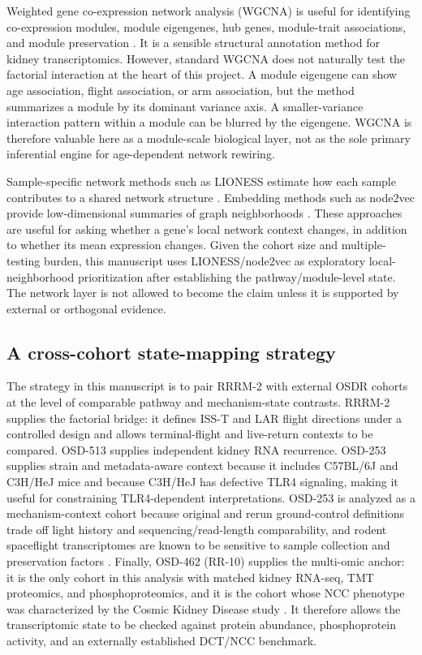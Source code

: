 \documentclass[11pt]{article}
\begin{document}
Weighted gene co-expression network analysis (WGCNA) is useful for identifying co-expression modules, module eigengenes, hub genes, module-trait associations, and module preservation \citep{langfelder2008wgcna,langfelder2011preservation}. It is a sensible structural annotation method for kidney transcriptomics. However, standard WGCNA does not naturally test the factorial interaction at the heart of this project. A module eigengene can show age association, flight association, or arm association, but the method summarizes a module by its dominant variance axis. A smaller-variance interaction pattern within a module can be blurred by the eigengene. WGCNA is therefore valuable here as a module-scale biological layer, not as the sole primary inferential engine for age-dependent network rewiring.

Sample-specific network methods such as LIONESS estimate how each sample contributes to a shared network structure \citep{kuijjer2019estimating}. Embedding methods such as node2vec provide low-dimensional summaries of graph neighborhoods \citep{grover2016node2vec}. These approaches are useful for asking whether a gene's local network context changes, in addition to whether its mean expression changes. Given the cohort size and multiple-testing burden, this manuscript uses LIONESS/node2vec as exploratory local-neighborhood prioritization after establishing the pathway/module-level state. The network layer is not allowed to become the claim unless it is supported by external or orthogonal evidence.

\subsection{A cross-cohort state-mapping strategy}

The strategy in this manuscript is to pair RRRM-2 with external OSDR cohorts at the level of comparable pathway and mechanism-state contrasts. RRRM-2 supplies the factorial bridge: it defines ISS-T and LAR flight directions under a controlled design and allows terminal-flight and live-return contexts to be compared. OSD-513 supplies independent kidney RNA recurrence. OSD-253 supplies strain and metadata-aware context because it includes C57BL/6J and C3H/HeJ mice and because C3H/HeJ has defective TLR4 signaling, making it useful for constraining TLR4-dependent interpretations. OSD-253 is analyzed as a mechanism-context cohort because original and rerun ground-control definitions trade off light history and sequencing/read-length comparability, and rodent spaceflight transcriptomes are known to be sensitive to sample collection and preservation factors \citep{galazka2020rnaseq,preserve2016}. Finally, OSD-462 (RR-10) supplies the multi-omic anchor: it is the only cohort in this analysis with matched kidney RNA-seq, TMT proteomics, and phosphoproteomics, and it is the cohort whose NCC phenotype was characterized by the Cosmic Kidney Disease study \citep{siew2024cosmic}. It therefore allows the transcriptomic state to be checked against protein abundance, phosphoprotein activity, and an externally established DCT/NCC benchmark.
\end{document}
